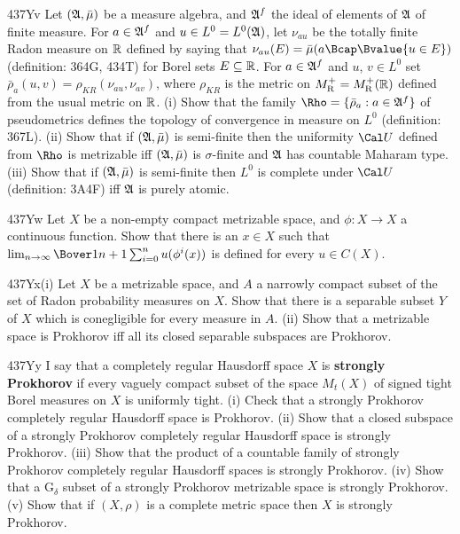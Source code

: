 {\spheader 437Yv Let $(\frak A,\bar\mu)$ be a measure algebra, and
$\frak A^f$ the ideal of elements of $\frak A$ of finite measure.   For
$a\in\frak A^f$ and $u\in L^0=L^0(\frak A)$, let $\nu_{au}$ be the totally
finite Radon measure on $\Bbb R$ defined by saying that
$\nu_{au}(E)=\bar\mu(a\Bcap\Bvalue{u\in E})$ (definition:  364G, 434T) for Borel
sets $E\subseteq\Bbb R$.   For $a\in\frak A^f$ and $u$, $v\in L^0$ set
$\bar\rho_a(u,v)=\rho_{KR}(\nu_{au},\nu_{av})$, where $\rho_{KR}$ is the metric
on $M^+_{\text{R}}=M^+_{\text{R}}(\Bbb R)$ defined from the usual metric on $\Bbb R$.   (i) Show that
the family $\Rho=\{\bar\rho_a:a\in\frak A^f\}$ of pseudometrics
defines the topology of convergence in measure on $L^0$ (definition:  367L).
(ii) Show that if $(\frak A,\bar\mu)$ is
semi-finite then the uniformity $\Cal U$
defined from $\Rho$ is metrizable iff $(\frak A,\bar\mu)$ is $\sigma$-finite and
$\frak A$ has countable Maharam type.   (iii) Show that if $(\frak A,\bar\mu)$
is semi-finite then $L^0$ is complete under $\Cal U$ (definition:  3A4F)
iff $\frak A$ is purely
atomic.   

\spheader 437Yw Let $X$ be a non-empty compact metrizable
space, and $\phi:X\to X$ a continuous function.   Show that there is an
$x\in X$ such that $\lim_{n\to\infty}\Bover1{n+1}\sum_{i=0}^nu(\phi^i(x))$
is defined for every $u\in C(X)$.   

\spheader 437Yx(i) Let $X$ be a metrizable space, and $A$ a narrowly
compact subset of the set of Radon probability measures on $X$.   Show
that there is a separable subset
$Y$ of $X$ which is conegligible for every measure in $A$.   (ii) Show
that a metrizable space is Prokhorov iff all its closed separable
subspaces are Prokhorov.

\spheader 437Yy I say that a completely regular Hausdorff space
$X$ is {\bf strongly Prokhorov}
if every vaguely compact subset of the space $M_t(X)$ of signed tight
Borel measures
on $X$ is uniformly tight.   (i) Check that a strongly Prokhorov
completely regular Hausdorff space is Prokhorov.  (ii) Show that a
closed subspace of a strongly Prokhorov
completely regular Hausdorff space is strongly Prokhorov.   (iii) Show
that the product of a countable family of strongly Prokhorov completely
regular Hausdorff spaces is
strongly Prokhorov.   (iv) Show that a G$_{\delta}$ subset of a strongly
Prokhorov metrizable space is strongly Prokhorov.   (v) Show that if
$(X,\rho)$ is a complete metric space then $X$ is strongly Prokhorov.

}
